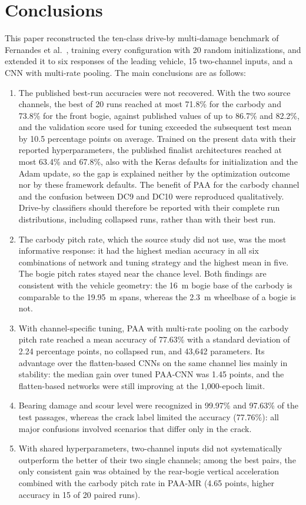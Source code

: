 \section{Conclusions}
\label{sec:conclusion}

This paper reconstructed the ten-class drive-by multi-damage benchmark of
Fernandes et al.~\cite{fernandes2025early}, training every configuration with
20 random initializations, and extended it to six responses of the leading
vehicle, 15 two-channel inputs, and a CNN with multi-rate pooling. The main
conclusions are as follows:
\begin{enumerate}
  \item The published best-run accuracies were not recovered. With the two
  source channels, the best of 20 runs reached at most 71.8\% for the carbody
  and 73.8\% for the front bogie, against published values of up to 86.7\% and
  82.2\%, and the validation score used for tuning exceeded the subsequent test
  mean by 10.5 percentage points on average. Trained on the present data with
  their reported hyperparameters, the published finalist architectures reached
  at most 63.4\% and 67.8\%, also with the Keras defaults for initialization
  and the Adam update, so the gap is explained neither by the optimization
  outcome nor by these framework defaults. The benefit of PAA for the carbody
  channel and the confusion between DC9 and DC10 were reproduced qualitatively.
  Drive-by classifiers should therefore be reported with their complete run
  distributions, including collapsed runs, rather than with their best run.
  \item The carbody pitch rate, which the source study did not use, was the
  most informative response: it had the highest median accuracy in all six
  combinations of network and tuning strategy and the highest mean in five. The
  bogie pitch rates stayed near the chance level. Both findings are consistent
  with the vehicle geometry: the 16~m bogie base of the carbody is comparable to
  the 19.95~m spans, whereas the 2.3~m wheelbase of a bogie is not.
  \item With channel-specific tuning, PAA with multi-rate pooling on the
  carbody pitch rate reached a mean accuracy of 77.63\% with a standard
  deviation of 2.24 percentage points, no collapsed run, and 43,642 parameters.
  Its advantage over the flatten-based CNNs on the same channel lies mainly in
  stability: the median gain over tuned PAA-CNN was 1.45 points, and the
  flatten-based networks were still improving at the 1,000-epoch limit.
  \item Bearing damage and scour level were recognized in 99.97\% and 97.63\% of
  the test passages, whereas the crack label limited the accuracy (77.76\%):
  all major confusions involved scenarios that differ only in the crack.
  \item With shared hyperparameters, two-channel inputs did not systematically
  outperform the better of their two single channels; among the best pairs,
  the only consistent gain was obtained by the rear-bogie vertical acceleration
  combined with the carbody pitch rate in PAA-MR (4.65 points, higher accuracy
  in 15 of 20 paired runs).
\end{enumerate}

